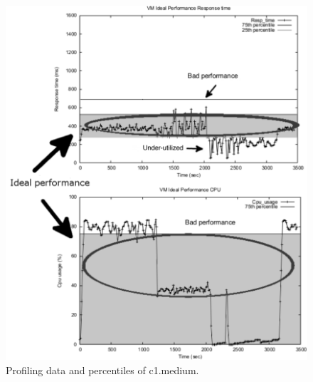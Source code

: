 \begin{enumerate}
\begin{figure}
  \begin{center}
    \includegraphics[width=\linewidth]{images/idealc1MediumRemark.pdf}
  \end{center}
\vspace{-5mm}
  \caption{Profiling data and percentiles of c1.medium.}
  \label{fig:vm_performance2}
\end{figure}



\end{enumerate}
